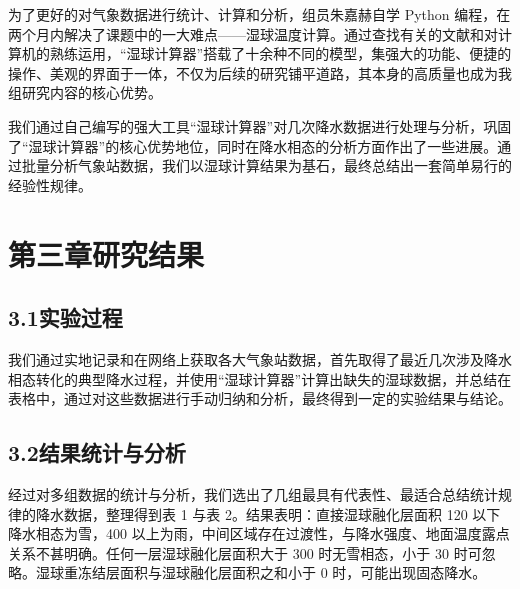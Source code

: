 为了更好的对气象数据进行统计、计算和分析，组员朱嘉赫自学 Python 编程，在两个月内解决了课题中的一大难点——湿球温度计算。通过查找有关的文献和对计算机的熟练运用，“湿球计算器”搭载了十余种不同的模型，集强大的功能、便捷的操作、美观的界面于一体，不仅为后续的研究铺平道路，其本身的高质量也成为我组研究内容的核心优势。

我们通过自己编写的强大工具“湿球计算器”对几次降水数据进行处理与分析，巩固了“湿球计算器”的核心优势地位，同时在降水相态的分析方面作出了一些进展。通过批量分析气象站数据，我们以湿球计算结果为基石，最终总结出一套简单易行的经验性规律。

\section*{第三章\quad 研究结果}

\subsection*{3.1\quad 实验过程}

我们通过实地记录和在网络上获取各大气象站数据，首先取得了最近几次涉及降水相态转化的典型降水过程，并使用“湿球计算器”计算出缺失的湿球数据，并总结在表格中，通过对这些数据进行手动归纳和分析，最终得到一定的实验结果与结论。

\subsection*{3.2\quad 结果统计与分析}

经过对多组数据的统计与分析，我们选出了几组最具有代表性、最适合总结统计规律的降水数据，整理得到表 1 与表 2。结果表明：直接湿球融化层面积 120 以下降水相态为雪，400 以上为雨，中间区域存在过渡性，与降水强度、地面温度露点关系不甚明确。任何一层湿球融化层面积大于 300 时无雪相态，小于 30 时可忽略。湿球重冻结层面积与湿球融化层面积之和小于 0 时，可能出现固态降水。

